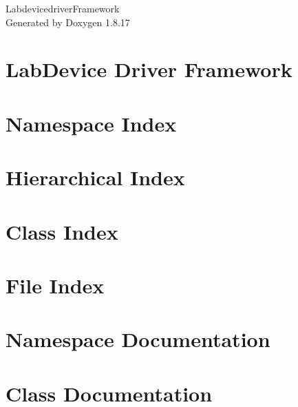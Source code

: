 \let\mypdfximage\pdfximage\def\pdfximage{\immediate\mypdfximage}\documentclass[twoside]{book}
\newcommand{\+}{\discretionary{\mbox{\scriptsize$\hookleftarrow$}}{}{}}
\newcommand{\clearemptydoublepage}{%
  \newpage{\pagestyle{empty}\cleardoublepage}%
}
\begin{document}
\hypersetup{pageanchor=false,
             bookmarksnumbered=true,
             pdfencoding=unicode
            }
\begin{titlepage}
\vspace*{7cm}
\begin{center}%
{\Large Labdevicedriver\+Framework }\\
\vspace*{1cm}
{\large Generated by Doxygen 1.8.17}\\
\end{center}
\end{titlepage}
\clearemptydoublepage
{}
\tableofcontents
\clearemptydoublepage
{}
\hypersetup{pageanchor=true}

\chapter{Lab\+Device Driver Framework}
\label{index}\hypertarget{index}{}
\chapter{Namespace Index}

\chapter{Hierarchical Index}

\chapter{Class Index}

\chapter{File Index}

\chapter{Namespace Documentation}




\chapter{Class Documentation}











\end{document}

